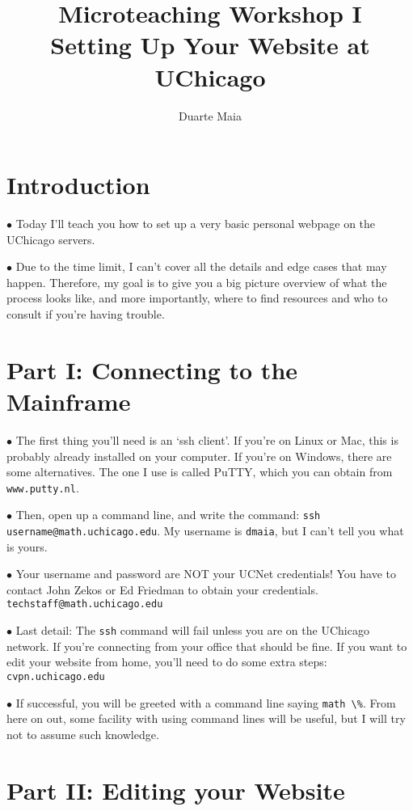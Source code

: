 \documentclass{article}
\title{Microteaching Workshop I\\Setting Up Your Website at UChicago}
\author{Duarte Maia}
\newcommand\point[1]{\noindent \hspace{\labelsep} $\bullet$ #1 \smallskip}
\begin{document}
\maketitle

\section{Introduction}

\point{Today I'll teach you how to set up a very basic personal webpage on the UChicago servers.}

\point{Due to the time limit, I can't cover all the details and edge cases that may happen. Therefore, my goal is to give you a big picture overview of what the process looks like, and more importantly, where to find resources and who to consult if you're having trouble.}

\section{Part I: Connecting to the Mainframe}

\point{The first thing you'll need is an `ssh client'. If you're on Linux or Mac, this is probably already installed on your computer. If you're on Windows, there are some alternatives. The one I use is called PuTTY, which you can obtain from \lstinline{www.putty.nl}.}

\point{Then, open up a command line, and write the command: \lstinline{ssh username@math.uchicago.edu}. My username is \lstinline{dmaia}, but I can't tell you what is yours.}

\point{Your username and password are NOT your UCNet credentials! You have to contact John Zekos or Ed Friedman to obtain your credentials. \lstinline{techstaff@math.uchicago.edu}}

\point{Last detail: The \lstinline{ssh} command will fail unless you are on the UChicago network. If you're connecting from your office that should be fine. If you want to edit your website from home, you'll need to do some extra steps: \lstinline{cvpn.uchicago.edu}}

\point{If successful, you will be greeted with a command line saying \lstinline{math \%}. From here on out, some facility with using command lines will be useful, but I will try not to assume such knowledge.}

\section{Part II: Editing your Website}
\end{document}
